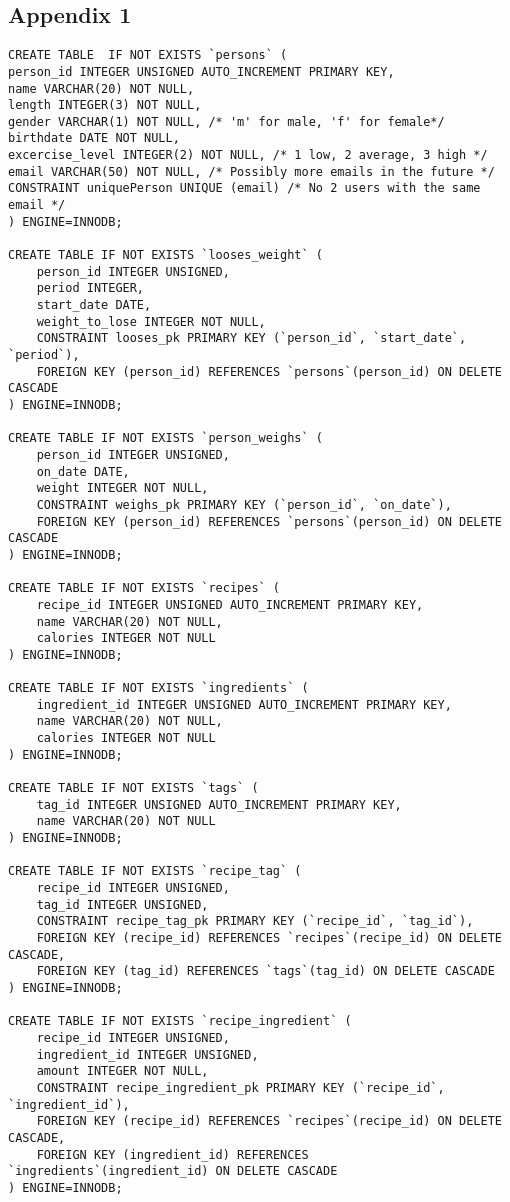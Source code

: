 \documentclass{article}
\begin{document}
\subsection*{Appendix 1}
\begin{lstlisting}[caption=Script of database]
CREATE TABLE  IF NOT EXISTS `persons` (
person_id INTEGER UNSIGNED AUTO_INCREMENT PRIMARY KEY,
name VARCHAR(20) NOT NULL,
length INTEGER(3) NOT NULL,
gender VARCHAR(1) NOT NULL, /* 'm' for male, 'f' for female*/
birthdate DATE NOT NULL,
excercise_level INTEGER(2) NOT NULL, /* 1 low, 2 average, 3 high */
email VARCHAR(50) NOT NULL, /* Possibly more emails in the future */
CONSTRAINT uniquePerson UNIQUE (email) /* No 2 users with the same email */
) ENGINE=INNODB;

CREATE TABLE IF NOT EXISTS `looses_weight` (
    person_id INTEGER UNSIGNED,
    period INTEGER,
    start_date DATE,
    weight_to_lose INTEGER NOT NULL,
    CONSTRAINT looses_pk PRIMARY KEY (`person_id`, `start_date`, `period`),
    FOREIGN KEY (person_id) REFERENCES `persons`(person_id) ON DELETE CASCADE
) ENGINE=INNODB;

CREATE TABLE IF NOT EXISTS `person_weighs` (
    person_id INTEGER UNSIGNED,
    on_date DATE,
    weight INTEGER NOT NULL,
    CONSTRAINT weighs_pk PRIMARY KEY (`person_id`, `on_date`),
    FOREIGN KEY (person_id) REFERENCES `persons`(person_id) ON DELETE CASCADE
) ENGINE=INNODB;

CREATE TABLE IF NOT EXISTS `recipes` (
    recipe_id INTEGER UNSIGNED AUTO_INCREMENT PRIMARY KEY,
    name VARCHAR(20) NOT NULL,
    calories INTEGER NOT NULL
) ENGINE=INNODB;

CREATE TABLE IF NOT EXISTS `ingredients` (
    ingredient_id INTEGER UNSIGNED AUTO_INCREMENT PRIMARY KEY,
    name VARCHAR(20) NOT NULL,
    calories INTEGER NOT NULL
) ENGINE=INNODB;

CREATE TABLE IF NOT EXISTS `tags` (
    tag_id INTEGER UNSIGNED AUTO_INCREMENT PRIMARY KEY,
    name VARCHAR(20) NOT NULL
) ENGINE=INNODB;

CREATE TABLE IF NOT EXISTS `recipe_tag` (
    recipe_id INTEGER UNSIGNED,
    tag_id INTEGER UNSIGNED,
    CONSTRAINT recipe_tag_pk PRIMARY KEY (`recipe_id`, `tag_id`),
    FOREIGN KEY (recipe_id) REFERENCES `recipes`(recipe_id) ON DELETE CASCADE,
    FOREIGN KEY (tag_id) REFERENCES `tags`(tag_id) ON DELETE CASCADE
) ENGINE=INNODB;

CREATE TABLE IF NOT EXISTS `recipe_ingredient` (
    recipe_id INTEGER UNSIGNED,
    ingredient_id INTEGER UNSIGNED,
    amount INTEGER NOT NULL,
    CONSTRAINT recipe_ingredient_pk PRIMARY KEY (`recipe_id`, `ingredient_id`),
    FOREIGN KEY (recipe_id) REFERENCES `recipes`(recipe_id) ON DELETE CASCADE,
    FOREIGN KEY (ingredient_id) REFERENCES `ingredients`(ingredient_id) ON DELETE CASCADE
) ENGINE=INNODB;


\end{lstlisting}
\end{document}

